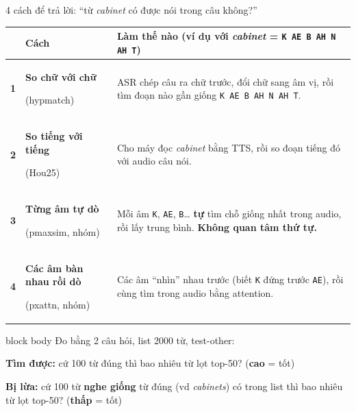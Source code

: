 \documentclass[aspectratio=169,xcolor=table]{beamer}
\begin{document}
\begin{frame}{4 cách để trả lời: ``từ \textit{cabinet} có được nói trong câu không?''}
\centering\small\setlength{\tabcolsep}{5pt}
\begin{tabular}{c p{3.3cm} p{8.4cm}}
\toprule
 & Cách & Làm thế nào (ví dụ với \textit{cabinet} = \texttt{K AE B AH N AH T})\\
\midrule
\textbf{1} & \textbf{So chữ với chữ}\par{\scriptsize (hypmatch)} & ASR chép câu ra chữ trước, đổi chữ sang âm vị, rồi tìm đoạn nào gần giống \texttt{K AE B AH N AH T}.\\[2pt]
\textbf{2} & \textbf{So tiếng với tiếng}\par{\scriptsize (Hou25)} & Cho máy đọc \textit{cabinet} bằng TTS, rồi so đoạn tiếng đó với audio câu nói.\\[2pt]
\textbf{3} & \textbf{Từng âm tự dò}\par{\scriptsize (pmaxsim, nhóm)} & Mỗi âm \texttt{K}, \texttt{AE}, \texttt{B}\ldots{} \textbf{tự} tìm chỗ giống nhất trong audio, rồi lấy trung bình. \textbf{Không quan tâm thứ tự.}\\[2pt]
\textbf{4} & \textbf{Các âm bàn nhau rồi dò}\par{\scriptsize (pxattn, nhóm)} & Các âm ``nhìn'' nhau trước (biết \texttt{K} đứng trước \texttt{AE}), rồi cùng tìm trong audio bằng attention.\\
\bottomrule
\end{tabular}
\raggedright\vspace{0.1cm}
\begin{beamercolorbox}[sep=0.45em,rounded=true]{block body}
\footnotesize Đo bằng 2 câu hỏi, list 2000 từ, test-other:\par
\textbf{Tìm được:} cứ 100 từ đúng thì bao nhiêu từ lọt top-50? \;(\textbf{cao} = tốt)\par
\textbf{Bị lừa:} cứ 100 từ \textbf{nghe giống} từ đúng (vd \textit{cabinets}) có trong list thì bao nhiêu từ lọt top-50? \;(\textbf{thấp} = tốt)
\end{beamercolorbox}
\end{frame}
\end{document}
